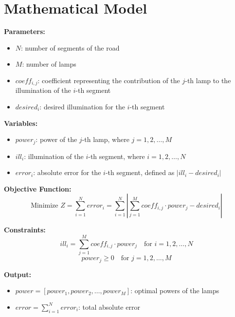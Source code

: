 \documentclass{article}
\begin{document}
\section*{Mathematical Model}

\textbf{Parameters:}
\begin{itemize}
    \item $N$: number of segments of the road
    \item $M$: number of lamps
    \item $coeff_{i,j}$: coefficient representing the contribution of the $j$-th lamp to the illumination of the $i$-th segment
    \item $desired_i$: desired illumination for the $i$-th segment
\end{itemize}

\textbf{Variables:}
\begin{itemize}
    \item $power_j$: power of the $j$-th lamp, where $j = 1, 2, \ldots, M$
    \item $ill_i$: illumination of the $i$-th segment, where $i = 1, 2, \ldots, N$
    \item $error_i$: absolute error for the $i$-th segment, defined as $|ill_i - desired_i|$
\end{itemize}

\textbf{Objective Function:}
\[
\text{Minimize } Z = \sum_{i=1}^{N} error_i = \sum_{i=1}^{N} | \sum_{j=1}^{M} coeff_{i,j} \cdot power_j - desired_i |
\]

\textbf{Constraints:}
\[
ill_i = \sum_{j=1}^{M} coeff_{i,j} \cdot power_j \quad \text{for } i = 1, 2, \ldots, N
\]
\[
power_j \geq 0 \quad \text{for } j = 1, 2, \ldots, M
\]

\textbf{Output:}
\begin{itemize}
    \item $power = [power_1, power_2, \ldots, power_M]$: optimal powers of the lamps
    \item $error = \sum_{i=1}^{N} error_i$: total absolute error
\end{itemize}
\end{document}
